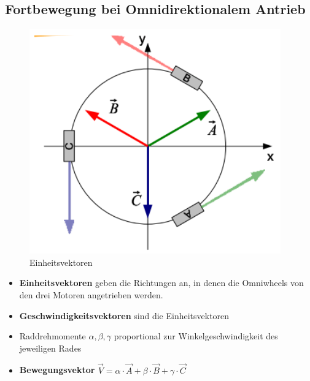 \subsection{Fortbewegung bei Omnidirektionalem Antrieb}
\begin{figure}[H]
	\begin{center}
		\includegraphics[scale=0.6]{Resources/PNG/EinheitsVektoren.PNG}
		\caption{Einheitsvektoren}
		\label{fig:PNG/EinheitsVektoren.PNG}
	\end{center}
\end{figure}
\begin{itemize}
	\item \textbf{Einheitsvektoren} geben die Richtungen an, in denen die Omniwheels von den drei Motoren angetrieben werden.
	\item \textbf{Geschwindigkeitsvektoren} sind die Einheitsvektoren
	\item Raddrehmomente $\alpha, \beta, \gamma$ proportional zur Winkelgeschwindigkeit des jeweiligen Rades
	\item \textbf{Bewegungsvektor} $\vec{V}=\alpha \cdot \vec{A}+\beta \cdot \vec{B}+\gamma \cdot \vec{C}$
\end{itemize}












	








